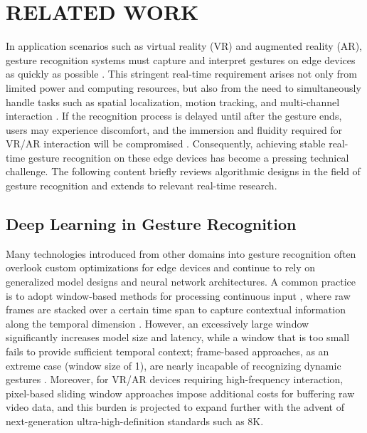 \section{RELATED WORK}
In application scenarios such as virtual reality (VR) and augmented reality (AR), gesture recognition systems must capture and interpret gestures on edge devices as quickly as possible \cite{9283348, shen2024ringgesture}. This stringent real-time requirement arises not only from limited power and computing resources, but also from the need to simultaneously handle tasks such as spatial localization, motion tracking, and multi-channel interaction \cite{shen2023fast}. If the recognition process is delayed until after the gesture ends, users may experience discomfort, and the immersion and fluidity required for VR/AR interaction will be compromised \cite{shen2024towards}. Consequently, achieving stable real-time gesture recognition on these edge devices has become a pressing technical challenge. The following content briefly reviews algorithmic designs in the field of gesture recognition and extends to relevant real-time research.

\subsection{Deep Learning in Gesture Recognition}
Many technologies introduced from other domains into gesture recognition often overlook custom optimizations for edge devices and continue to rely on generalized model designs and neural network architectures. A common practice is to adopt window-based methods for processing continuous input \cite{8756576}, where raw frames are stacked over a certain time span to capture contextual information along the temporal dimension \cite{8756576, 9264164}. However, an excessively large window significantly increases model size and latency, while a window that is too small fails to provide sufficient temporal context; frame-based approaches, as an extreme case (window size of 1), are nearly incapable of recognizing dynamic gestures \cite{caputo2021shrec}. Moreover, for VR/AR devices requiring high-frequency interaction, pixel-based sliding window approaches impose additional costs for buffering raw video data, and this burden is projected to expand further with the advent of next-generation ultra-high-definition standards such as 8K.

